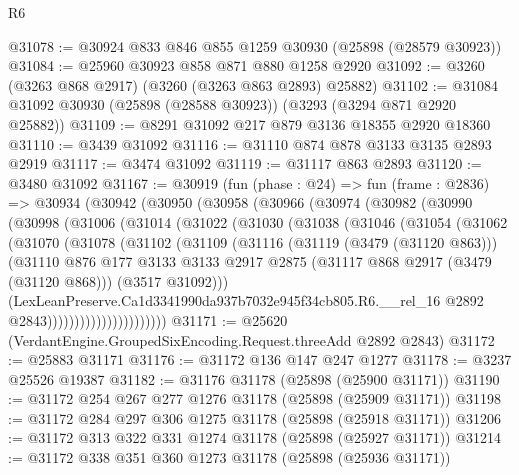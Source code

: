 \begin{lexlean}{R6}
\begin{coremodule}
@31078 := @30924 @833 @846 @855 @1259 @30930 (@25898 (@28579 @30923))
@31084 := @25960 @30923 @858 @871 @880 @1258 @2920
@31092 := @3260 (@3263 @868 @2917) (@3260 (@3263 @863 @2893) @25882)
@31102 := @31084 @31092 @30930 (@25898 (@28588 @30923)) (@3293 (@3294 @871 @2920 @25882))
@31109 := @8291 @31092 @217 @879 @3136 @18355 @2920 @18360
@31110 := @3439 @31092
@31116 := @31110 @874 @878 @3133 @3135 @2893 @2919
@31117 := @3474 @31092
@31119 := @31117 @863 @2893
@31120 := @3480 @31092
@31167 := @30919
    (fun (phase : @24) =>
    fun (frame : @2836) =>
    @30934
      (@30942
        (@30950
          (@30958
            (@30966
              (@30974
                (@30982
                  (@30990
                    (@30998
                      (@31006
                        (@31014
                          (@31022
                            (@31030
                              (@31038
                                (@31046
                                  (@31054
                                    (@31062
                                      (@31070
                                        (@31078
                                          (@31102
                                            (@31109
                                              (@31116
                                                (@31119 (@3479 (@31120 @863)))
                                                (@31110
                                                  @876
                                                  @177
                                                  @3133
                                                  @3133
                                                  @2917
                                                  @2875
                                                  (@31117 @868 @2917 (@3479 (@31120 @868)))
                                                  (@3517 @31092)))
                                              (LexLeanPreserve.Ca1d3341990da937b7032e945f34cb805.R6.__rel_16
                                                @2892
                                                @2843))))))))))))))))))))))
@31171 := @25620 (VerdantEngine.GroupedSixEncoding.Request.threeAdd @2892 @2843)
@31172 := @25883 @31171
@31176 := @31172 @136 @147 @247 @1277
@31178 := @3237 @25526 @19387
@31182 := @31176 @31178 (@25898 (@25900 @31171))
@31190 := @31172 @254 @267 @277 @1276 @31178 (@25898 (@25909 @31171))
@31198 := @31172 @284 @297 @306 @1275 @31178 (@25898 (@25918 @31171))
@31206 := @31172 @313 @322 @331 @1274 @31178 (@25898 (@25927 @31171))
@31214 := @31172 @338 @351 @360 @1273 @31178 (@25898 (@25936 @31171))

\end{coremodule}
\end{lexlean}
